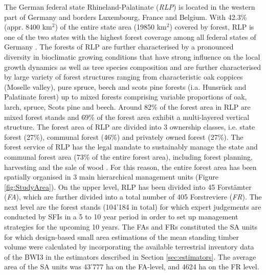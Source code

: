 The German federal state Rhineland-Palatinate (\textit{RLP}) is located in the western part of Germany and borders Luxembourg, France and Belgium. With 42.3\% (appr. 8400 km$^2$) of the entire state area (19850 km$^2$) covered by forest, RLP is one of the two states with the highest forest coverage among all federal states of Germany \citep{bwi3}. The forests of RLP are further characterised by a pronounced diversity in bioclimatic growing conditions that have strong influence on the local growth dynamics as well as tree species composition \citep{gauer2005} and are further characterised by large variety of forest structures ranging from characteristic oak coppices (Moselle valley), pure spruce, beech and scots pine forests (i.a. Hunsr{\"u}ck and Palatinate forest) up to mixed forests comprising variable proportions of oak, larch, spruce, Scots pine and beech. Around 82\% of the forest area in RLP are mixed forest stands and 69\% of the forest area exhibit a multi-layered vertical structure. The forest area of RLP are divided into 3 ownership classes, i.e. state forest (27\%), communal forest (46\%) and privately owned forest (27\%). The forest service of RLP has the legal mandate to sustainably manage the state and communal forest area (73\% of the entire forest area), including forest planning, harvesting and the sale of wood \citep{lwaldg_rlp}. For this reason, the entire forest area has been spatially organised in 3 main hierarchical management units (Figure \ref{fig:StudyArea}). On the upper level, RLP has been divided into 45 Forst{\"a}mter (\textit{FA}), which are further divided into a total number of 405 Forstreviere (\textit{FR}). The next level are the forest stands (104'184 in total) for which expert judgements are conducted by SFIs in a 5 to 10 year period in order to set up management strategies for the upcoming 10 years. The FAs and FRs constituted the SA units for which design-based small area estimations of the mean standing timber volume were calculated by incorporating the available terrestrial inventory data of the BWI3 in the estimators described in Section \ref{sec:estimators}. The average area of the SA units was 43'777 ha on the FA-level, and 4624 ha on the FR level.



